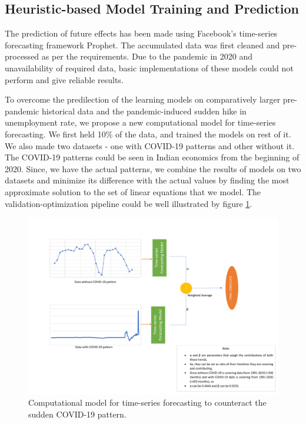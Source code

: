 \documentclass[10pt,journal,compsoc]{IEEEtran}
\begin{document}
\subsection{Heuristic-based Model Training and Prediction}
The prediction of future effects has been made using Facebook's time-series forecasting framework Prophet. The accumulated data was first cleaned and pre-processed as per the requirements. Due to the pandemic in 2020 and unavailability of required data, basic implementations of these models could not perform and give reliable results. 

To overcome the predilection of the learning models on comparatively larger pre-pandemic historical data and the pandemic-induced sudden hike in unemployment rate, we propose a new computational model for time-series forecasting. We first held 10\% of the data, and trained the models on rest of it. We also made two datasets - one with COVID-19 patterns and other without it. The COVID-19 patterns could be seen in Indian economics from the beginning of 2020. Since, we have the actual patterns, we combine the results of models on two datasets and minimize its difference with the actual values by finding the most approximate solution to the set of linear equations that we model. The validation-optimization pipeline could be well illustrated by figure \ref{Val-opt_Tech}.

\begin{figure}[!t]
\centering
\includegraphics[width=5in]{Figures/Predictor Model.pdf}
\caption{Computational model for time-series forecasting to counteract the sudden COVID-19 pattern.}
\label{Val-opt_Tech}
\end{figure}
\end{document}

